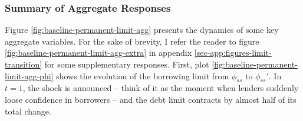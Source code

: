 \documentclass[a4paper,12pt]{article} %
\numberwithin{equation}{section} %
\numberwithin{figure}{section}
\numberwithin{table}{section}
\begin{document}
\subsubsection{Summary of Aggregate Responses}
\label{sec:limit-transition-summ}

Figure \ref{fig:baseline-permanent-limit-agg} presents the dynamics of some key aggregate variables. For the sake of brevity, I refer the reader to figure \ref{fig:baseline-permanent-limit-agg-extra} in appendix \ref{sec-app:figures-limit-transition} for some supplementary responses. First, plot \ref{fig:baseline-permanent-limit-agg-phi} shows the evolution of the borrowing limit from $\phi_{ss}$ to $\phi_{ss}'$. In $t=1$, the shock is announced -- think of it as the moment when lenders suddenly loose confidence in borrowers -- and the debt limit contracts by almost half of its total change.
\end{document}
